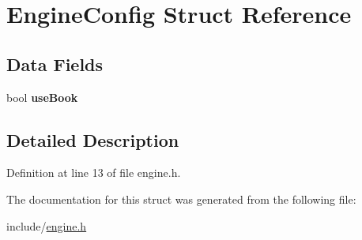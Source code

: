 \hypertarget{structEngineConfig}{}\section{Engine\+Config Struct Reference}
\label{structEngineConfig}
\subsection*{Data Fields}
\begin{DoxyCompactItemize}
\item 
\mbox{\label{structEngineConfig_a6f6849a5e9919e75b34cd44b8a25a7bf}} 
bool {\bfseries use\+Book}
\end{DoxyCompactItemize}


\subsection{Detailed Description}


Definition at line 13 of file engine.\+h.



The documentation for this struct was generated from the following file\+:\begin{DoxyCompactItemize}
\item 
include/\mbox{\hyperlink{engine_8h}{engine.\+h}}\end{DoxyCompactItemize}
